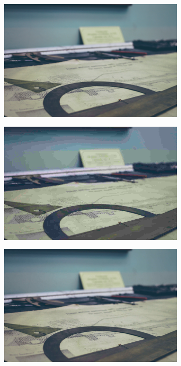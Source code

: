 \documentclass{article}
\begin{document}
\begin{figure}
 \ContinuedFloat
    \begin{subfigure}[b]{0.49 \textwidth}
    \includegraphics[width=\textwidth]{Images/test3.png}
    \end{subfigure}
    \begin{subfigure}[b]{0.49 \textwidth}
    \includegraphics[width=\textwidth]{Images/jpeg/reconstructed/test3_10.png}
    \end{subfigure}
    \begin{subfigure}[b]{0.49 \textwidth}
    \includegraphics[width=\textwidth]{Images/jpeg/reconstructed/test3_60.png}

\end{subfigure}
\end{figure}
\end{document}
